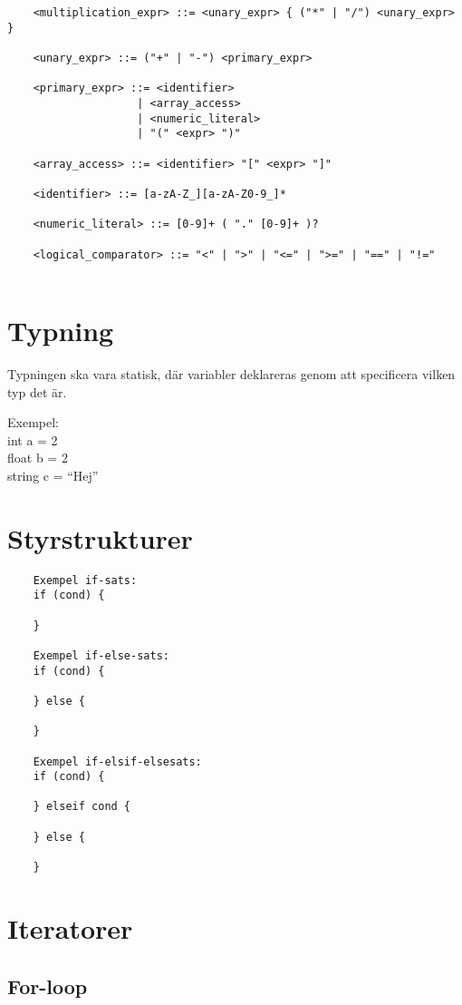 \documentclass{TDP003mall}
\begin{document}
\begin{verbatim}
    <multiplication_expr> ::= <unary_expr> { ("*" | "/") <unary_expr> }

    <unary_expr> ::= ("+" | "-") <primary_expr>

    <primary_expr> ::= <identifier> 
                    | <array_access>
                    | <numeric_literal> 
                    | "(" <expr> ")"

    <array_access> ::= <identifier> "[" <expr> "]"

    <identifier> ::= [a-zA-Z_][a-zA-Z0-9_]*

    <numeric_literal> ::= [0-9]+ ( "." [0-9]+ )?

    <logical_comparator> ::= "<" | ">" | "<=" | ">=" | "==" | "!="
    
    \end{verbatim}

    \section{Typning}
    Typningen ska vara statisk, där variabler deklareras genom att specificera vilken typ det är.

    Exempel: \\
    int a = 2 \\
    float b = 2 \\
    string c = ``Hej''

    \section{Styrstrukturer}
\begin{verbatim}
    Exempel if-sats:
    if (cond) {
      
    }

    Exempel if-else-sats:
    if (cond) {
      
    } else {

    }

    Exempel if-elsif-elsesats:
    if (cond) {
      
    } elseif cond {

    } else {

    }
\end{verbatim}

\section{Iteratorer}

\subsection{For-loop}
\end{document}
